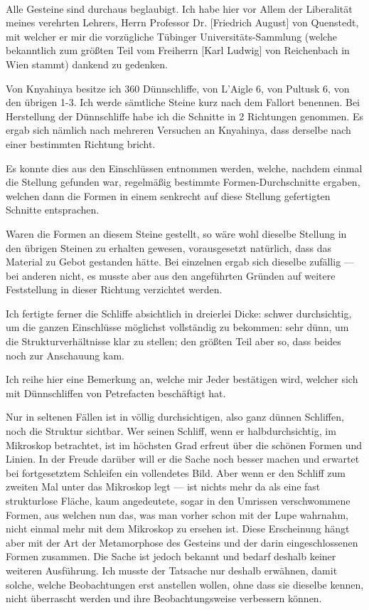 \documentclass[a4paper, 12pt, oneside]{article}
\begin{document}
\paragraph{}
Alle Gesteine sind durchaus beglaubigt. Ich habe hier vor Allem der Liberalität meines verehrten Lehrers, Herrn Professor Dr. [Friedrich August] von Quenstedt, mit welcher er mir die vorzügliche Tübinger Universitäts-Sammlung (welche bekanntlich zum größten Teil vom Freiherrn [Karl Ludwig] von Reichenbach in Wien stammt) dankend zu gedenken.

Von Knyahinya besitze ich 360 Dünnschliffe, von L'Aigle 6, von Pultusk 6, von den übrigen 1-3. Ich werde sämtliche Steine kurz nach dem Fallort benennen. Bei Herstellung der Dünnschliffe habe ich die Schnitte in 2 Richtungen genommen. Es ergab sich nämlich nach mehreren Versuchen an Knyahinya, dass derselbe nach einer bestimmten Richtung bricht.

Es konnte dies aus den Einschlüssen entnommen werden, welche, nachdem einmal die Stellung gefunden war, regelmäßig bestimmte Formen-Durchschnitte ergaben, welchen dann die Formen in einem senkrecht auf diese Stellung gefertigten Schnitte entsprachen.

Waren die Formen an diesem Steine gestellt, so wäre wohl dieselbe Stellung in den übrigen Steinen zu erhalten gewesen, vorausgesetzt natürlich, dass das Material zu Gebot gestanden hätte. Bei einzelnen ergab sich dieselbe zufällig — bei anderen nicht, es musste aber aus den angeführten Gründen auf weitere Feststellung in dieser Richtung verzichtet werden.

Ich fertigte ferner die Schliffe absichtlich in dreierlei Dicke: schwer durchsichtig, um die ganzen Einschlüsse möglichst vollständig zu bekommen: sehr dünn, um die Strukturverhältnisse klar zu stellen; den größten Teil aber so, dass beides noch zur Anschauung kam.

Ich reihe hier eine Bemerkung an, welche mir Jeder bestätigen wird, welcher sich mit Dünnschliffen von Petrefacten beschäftigt hat.

Nur in seltenen Fällen ist in völlig durchsichtigen, also ganz dünnen Schliffen, noch die Struktur sichtbar. Wer seinen Schliff, wenn er halbdurchsichtig, im Mikroskop betrachtet, ist im höchsten Grad erfreut über die schönen Formen und Linien. In der Freude darüber will er die Sache noch besser machen und erwartet bei fortgesetztem Schleifen ein vollendetes Bild. Aber wenn er den Schliff zum zweiten Mal unter das Mikroskop legt — ist nichts mehr da als eine fast strukturlose Fläche, kaum angedeutete, sogar in den Umrissen verschwommene Formen, aus welchen nun das, was man vorher schon mit der Lupe wahrnahm, nicht einmal mehr mit dem Mikroskop zu ersehen ist. Diese Erscheinung hängt aber mit der Art der Metamorphose des Gesteins und der darin eingeschlossenen Formen zusammen. Die Sache ist jedoch bekannt und bedarf deshalb keiner weiteren Ausführung. Ich musste der Tatsache nur deshalb erwähnen, damit solche, welche Beobachtungen erst anstellen wollen, ohne dass sie dieselbe kennen, nicht überrascht werden und ihre Beobachtungsweise verbessern können.
\end{document}
